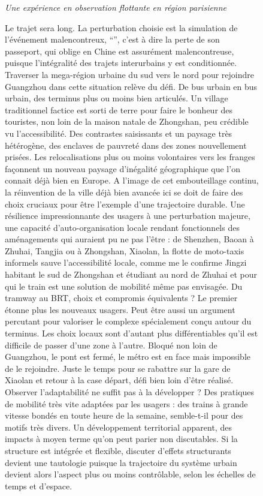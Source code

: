 \begin{figure}[h!]
\begin{mdframed}
\medskip

 \textit{Une expérience en observation flottante en région parisienne}
\end{mdframed}
\end{figure}




\begin{figure}[h!]
\begin{mdframed}
Le trajet sera long. La perturbation choisie est la simulation de l'événement malencontreux, ``'', c'est à dire la perte de son passeport, qui oblige 
 en Chine est assurément malencontreuse, puisque l'intégralité des trajets interurbains y est conditionnée. Traverser la mega-région urbaine du sud vers le nord pour rejoindre Guangzhou dans cette situation relève du défi. De bus urbain en bus urbain, des terminus plus ou moins bien articulés. Un village traditionnel factice est sorti de terre pour faire le bonheur des touristes, non loin de la maison natale de Zhongshan, peu crédible vu l'accessibilité. Des contrastes saisissants et un paysage très hétérogène, des enclaves de pauvreté dans des zones nouvellement prisées. Les relocalisations plus ou moins volontaires vers les franges façonnent un nouveau paysage d'inégalité géographique que l'on connait déjà bien en Europe. A l'image de cet embouteillage continu, la réinvention de la ville déjà bien avancée ici se doit de faire des choix cruciaux pour être l'exemple d'une trajectoire durable. Une résilience impressionnante des usagers à une perturbation majeure, une capacité d'auto-organisation locale rendant fonctionnels des aménagements qui auraient pu ne pas l'être : de Shenzhen, Baoan à Zhuhai, Tangjia ou à Zhongshan, Xiaolan, la flotte de moto-taxis informels sauve l'accessibilité locale, comme me le confirme Jingzi habitant le sud de Zhongshan et étudiant au nord de Zhuhai et pour qui le train est une solution de mobilité même pas envisagée. Du tramway au BRT, choix et compromis équivalents ? Le premier étonne plus les nouveaux usagers. Peut être aussi un argument percutant pour valoriser le complexe spécialement conçu autour du terminus. Les choix locaux sont d'autant plus différentiables qu'il est difficile de passer d'une zone à l'autre. Bloqué non loin de Guangzhou, le pont est fermé, le métro est en face mais impossible de le rejoindre. Juste le temps pour se rabattre sur la gare de Xiaolan et retour à la case départ, défi bien loin d'être réalisé. Observer l'adaptabilité ne suffit pas à la développer ? Des pratiques de mobilité très vite adaptées par les usagers : des trains à grande vitesse bondés en toute heure de la semaine, semble-t-il pour des motifs très divers. Un développement territorial apparent, des impacts à moyen terme qu'on peut parier non discutables. Si la structure est intégrée et flexible, discuter d'effets structurants devient une tautologie puisque la trajectoire du système urbain devient alors l'aspect plus ou moins contrôlable, selon les échelles de temps et d'espace.



\end{mdframed}
\end{figure}
